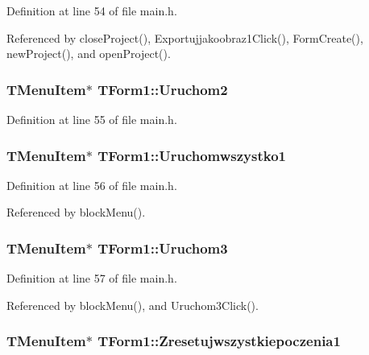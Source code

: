 Definition at line 54 of file main.h.

Referenced by closeProject(), Exportujjakoobraz1Click(), FormCreate(), newProject(), and openProject().\hypertarget{classTForm1_cc303ecddd253f90d5b943f96828b5ff}{
\subsubsection[Uruchom2]{\setlength{\rightskip}{0pt plus 5cm}TMenuItem$\ast$ {\bf TForm1::Uruchom2}}}
\label{classTForm1_cc303ecddd253f90d5b943f96828b5ff}




Definition at line 55 of file main.h.\hypertarget{classTForm1_ab12b0763ade8d2303fc0d9e9dba2757}{
\subsubsection[Uruchomwszystko1]{\setlength{\rightskip}{0pt plus 5cm}TMenuItem$\ast$ {\bf TForm1::Uruchomwszystko1}}}
\label{classTForm1_ab12b0763ade8d2303fc0d9e9dba2757}




Definition at line 56 of file main.h.

Referenced by blockMenu().\hypertarget{classTForm1_6f669f8e377edc9a83fc863c880a2940}{
\subsubsection[Uruchom3]{\setlength{\rightskip}{0pt plus 5cm}TMenuItem$\ast$ {\bf TForm1::Uruchom3}}}
\label{classTForm1_6f669f8e377edc9a83fc863c880a2940}




Definition at line 57 of file main.h.

Referenced by blockMenu(), and Uruchom3Click().\hypertarget{classTForm1_82b4fa841135fca89c74efd1a699ba6d}{
\subsubsection[Zresetujwszystkiepoczenia1]{\setlength{\rightskip}{0pt plus 5cm}TMenuItem$\ast$ {\bf TForm1::Zresetujwszystkiepoczenia1}}}
\label{classTForm1_82b4fa841135fca89c74efd1a699ba6d}




